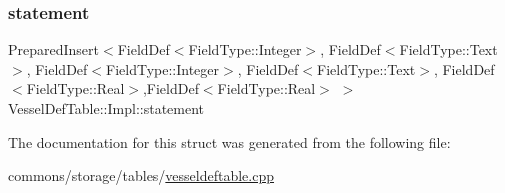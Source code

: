 \mbox{\label{struct_vessel_def_table_1_1_impl_a0d4fd618465d7888a666dcd6aed73614}} 
\subsubsection{\texorpdfstring{statement}{statement}}
{\footnotesize\ttfamily Prepared\+Insert$<$Field\+Def$<$Field\+Type\+::\+Integer$>$, Field\+Def$<$Field\+Type\+::\+Text$>$, Field\+Def$<$Field\+Type\+::\+Integer$>$, Field\+Def$<$Field\+Type\+::\+Text$>$, Field\+Def$<$Field\+Type\+::\+Real$>$,Field\+Def$<$Field\+Type\+::\+Real$>$ $>$ Vessel\+Def\+Table\+::\+Impl\+::statement}



The documentation for this struct was generated from the following file\+:\begin{DoxyCompactItemize}
\item 
commons/storage/tables/\mbox{\hyperlink{vesseldeftable_8cpp}{vesseldeftable.\+cpp}}\end{DoxyCompactItemize}
